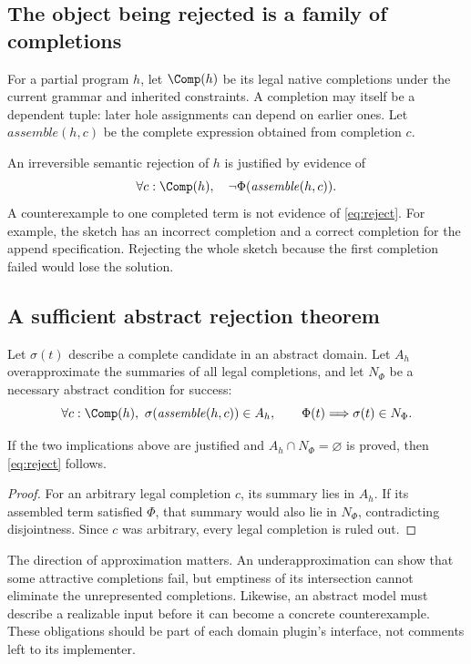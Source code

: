 \subsection{The object being rejected is a family of completions}
For a partial program $h$, let $\Comp(h)$ be its legal native completions under the current grammar and inherited constraints. A completion may itself be a dependent tuple: later hole assignments can depend on earlier ones. Let $\mathit{assemble}(h,c)$ be the complete expression obtained from completion $c$.

An irreversible semantic rejection of $h$ is justified by evidence of
\begin{equation}\label{eq:reject}
 \forall c:\Comp(h),\quad
 \neg\Phi(\mathit{assemble}(h,c)).
\end{equation}
A counterexample to one completed term is not evidence of \eqref{eq:reject}. For example, the sketch  has an incorrect completion  and a correct completion  for the append specification. Rejecting the whole sketch because the first completion failed would lose the solution.

\subsection{A sufficient abstract rejection theorem}
Let $\sigma(t)$ describe a complete candidate in an abstract domain. Let $A_h$ overapproximate the summaries of all legal completions, and let $N_\Phi$ be a necessary abstract condition for success:
\[
 \forall c:\Comp(h),\ \sigma(\mathit{assemble}(h,c))\in A_h,
 \qquad
 \Phi(t)\Longrightarrow \sigma(t)\in N_\Phi.
\]
\begin{proposition}
If the two implications above are justified and $A_h\cap N_\Phi=\varnothing$ is proved, then \eqref{eq:reject} follows.
\end{proposition}
\begin{proof}
For an arbitrary legal completion $c$, its summary lies in $A_h$. If its assembled term satisfied $\Phi$, that summary would also lie in $N_\Phi$, contradicting disjointness. Since $c$ was arbitrary, every legal completion is ruled out.
\end{proof}

The direction of approximation matters. An underapproximation can show that some attractive completions fail, but emptiness of its intersection cannot eliminate the unrepresented completions. Likewise, an abstract model must describe a realizable input before it can become a concrete counterexample. These obligations should be part of each domain plugin's interface, not comments left to its implementer.

